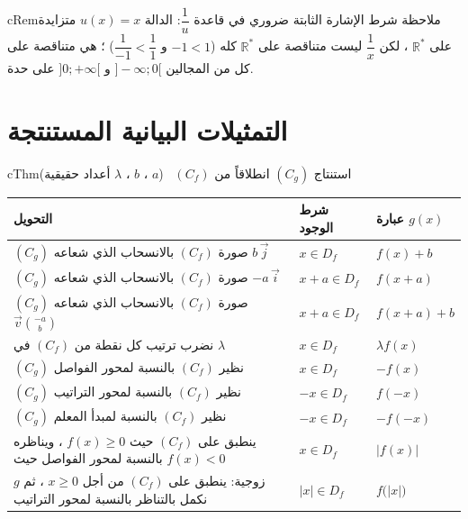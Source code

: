\documentclass[12pt,a4paper]{article}
\newenvironment{BOX}[2]{\begin{otherlanguage}{english}\begin{arbox}{#1}{#2}}{\end{arbox}\end{otherlanguage}}
\newenvironment{khassia}[1][خاصية]{\begin{BOX}{cThm}{#1}}{\end{BOX}}
\newenvironment{molahada}[1][ملاحظة]{\begin{BOX}{cRem}{#1}}{\end{BOX}}
\newcommand{\R}{\mathbb{R}}
\begin{document}
\begin{molahada}
شرط الإشارة الثابتة ضروري في قاعدة $\dfrac1u$: الدالة $u(x)=x$ متزايدة على $\R^*$ ، لكن $\dfrac1x$ ليست متناقصة على $\R^*$ كله ($-1<1$ و $\dfrac{1}{-1}<\dfrac11$) ؛ هي متناقصة على كل من المجالين $]-\infty;0[$ و $]0;+\infty[$ على حدة.
\end{molahada}

\section{التمثيلات البيانية المستنتجة}
\begin{khassia}[استنتاج $(C_g)$ انطلاقاً من $(C_f)$ \ ($a$ ، $b$ ، $\lambda$ أعداد حقيقية)]
\begin{center}
\renewcommand{\arraystretch}{1.45}
\begin{tabular}{|>{\centering\arraybackslash}m{9.4cm}|>{\centering\arraybackslash}m{2.6cm}|>{\centering\arraybackslash}m{3.2cm}|}\hline
\textbf{التحويل} & \textbf{شرط الوجود} & \textbf{عبارة} $g(x)$\\\hline
$(C_g)$ صورة $(C_f)$ بالانسحاب الذي شعاعه $b\,\vec j$ & $x\in D_f$ & $f(x)+b$\\\hline
$(C_g)$ صورة $(C_f)$ بالانسحاب الذي شعاعه $-a\,\vec i$ & $x+a\in D_f$ & $f(x+a)$\\\hline
$(C_g)$ صورة $(C_f)$ بالانسحاب الذي شعاعه $\vec v\binom{-a}{b}$ & $x+a\in D_f$ & $f(x+a)+b$\\\hline
نضرب ترتيب كل نقطة من $(C_f)$ في $\lambda$ & $x\in D_f$ & $\lambda f(x)$\\\hline
$(C_g)$ نظير $(C_f)$ بالنسبة لمحور الفواصل & $x\in D_f$ & $-f(x)$\\\hline
$(C_g)$ نظير $(C_f)$ بالنسبة لمحور التراتيب & $-x\in D_f$ & $f(-x)$\\\hline
$(C_g)$ نظير $(C_f)$ بالنسبة لمبدأ المعلم & $-x\in D_f$ & $-f(-x)$\\\hline
ينطبق على $(C_f)$ حيث $f(x)\ge0$ ، ويناظره بالنسبة لمحور الفواصل حيث $f(x)<0$ & $x\in D_f$ & $\big|f(x)\big|$\\\hline
$g$ زوجية: ينطبق على $(C_f)$ من أجل $x\ge0$ ، ثم نكمل بالتناظر بالنسبة لمحور التراتيب & $|x|\in D_f$ & $f\big(|x|\big)$\\\hline
\end{tabular}
\end{center}
\end{khassia}
\end{document}
